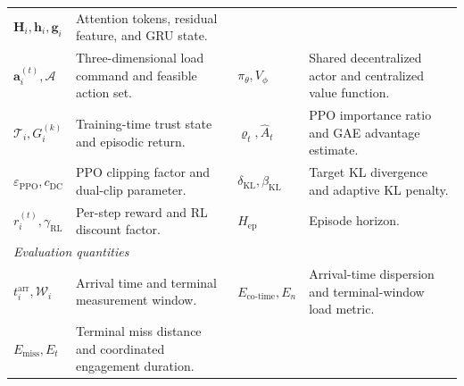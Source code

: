 \documentclass[lettersize,journal]{IEEEtran}
\begin{document}
\begin{table}[!t]
\begin{tabular}{@{}p{}p{}p{}p{}@{}}
$\mathbf H_i,\mathbf h_i,\mathbf g_i$ & Attention tokens, residual feature, and GRU state.\\
$\mathbf a_i^{(t)},\mathcal A$ & Three-dimensional load command and feasible action set. &
$\pi_\theta,V_\phi$ & Shared decentralized actor and centralized value function.\\
$\mathcal T_i,G_i^{(k)}$ & Training-time trust state and episodic return. &
$\varrho_t,\widehat A_t$ & PPO importance ratio and GAE advantage estimate.\\
$\varepsilon_{\mathrm{PPO}},c_{\mathrm{DC}}$ & PPO clipping factor and dual-clip parameter. &
$\delta_{\mathrm{KL}},\beta_{\mathrm{KL}}$ & Target KL divergence and adaptive KL penalty.\\
$r_i^{(t)},\gamma_{\mathrm{RL}}$ & Per-step reward and RL discount factor. &
$H_{\mathrm{ep}}$ & Episode horizon.\\
\midrule
\multicolumn{4}{l}{\emph{Evaluation quantities}}\\
$t_i^{\mathrm{arr}},\mathcal W_i$ & Arrival time and terminal measurement window. &
$E_{\mathrm{co\text{-}time}},E_n$ & Arrival-time dispersion and terminal-window load metric.\\
$E_{\mathrm{miss}},E_t$ & Terminal miss distance and coordinated engagement duration. & & \\
\bottomrule
\end{tabular}
\end{table}
\endgroup
 
\end{document}
